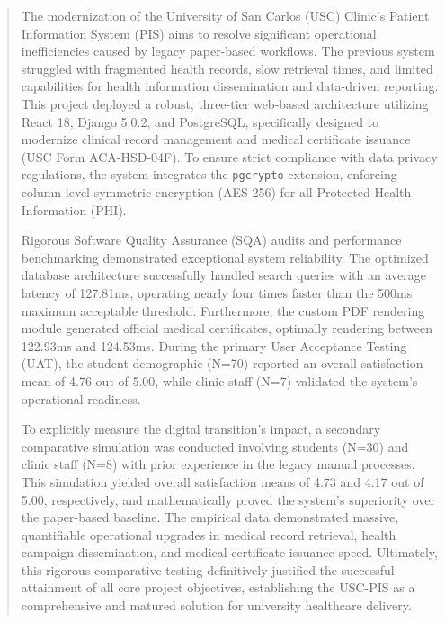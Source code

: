 \begin{abstract}
The modernization of the University of San Carlos (USC) Clinic’s Patient Information System (PIS) aims to resolve significant operational inefficiencies caused by legacy paper-based workflows. The previous system struggled with fragmented health records, slow retrieval times, and limited capabilities for health information dissemination and data-driven reporting. This project deployed a robust, three-tier web-based architecture utilizing React 18, Django 5.0.2, and PostgreSQL, specifically designed to modernize clinical record management and medical certificate issuance (USC Form ACA-HSD-04F). To ensure strict compliance with data privacy regulations, the system integrates the \texttt{pgcrypto} extension, enforcing column-level symmetric encryption (AES-256) for all Protected Health Information (PHI).

Rigorous Software Quality Assurance (SQA) audits and performance benchmarking demonstrated exceptional system reliability. The optimized database architecture successfully handled search queries with an average latency of 127.81ms, operating nearly four times faster than the 500ms maximum acceptable threshold. Furthermore, the custom PDF rendering module generated official medical certificates, optimally rendering between 122.93ms and 124.53ms. During the primary User Acceptance Testing (UAT), the student demographic (N=70) reported an overall satisfaction mean of 4.76 out of 5.00, while clinic staff (N=7) validated the system's operational readiness. 

To explicitly measure the digital transition's impact, a secondary comparative simulation was conducted involving students (N=30) and clinic staff (N=8) with prior experience in the legacy manual processes. This simulation yielded overall satisfaction means of 4.73 and 4.17 out of 5.00, respectively, and mathematically proved the system's superiority over the paper-based baseline. The empirical data demonstrated massive, quantifiable operational upgrades in medical record retrieval, health campaign dissemination, and medical certificate issuance speed. Ultimately, this rigorous comparative testing definitively justified the successful attainment of all core project objectives, establishing the USC-PIS as a comprehensive and matured solution for university healthcare delivery.
\end{abstract}
